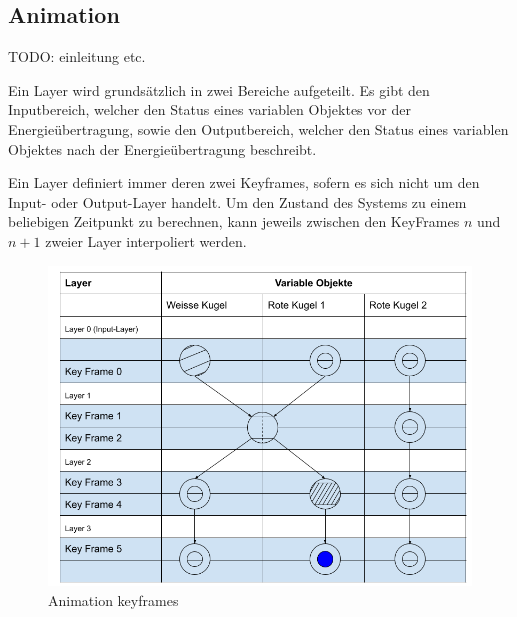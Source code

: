 \subsection{Animation}

TODO: einleitung etc.

Ein Layer wird grundsätzlich in zwei Bereiche aufgeteilt. Es gibt den Inputbereich, welcher den
Status eines variablen Objektes vor der Energieübertragung, sowie den Outputbereich, welcher den Status
eines variablen Objektes nach der Energieübertragung beschreibt.

Ein Layer definiert immer deren zwei Keyframes, sofern es sich nicht um den Input- oder Output-Layer handelt.
Um den Zustand des Systems zu einem beliebigen Zeitpunkt zu berechnen, kann
jeweils zwischen den KeyFrames $n$ und $n + 1$ zweier Layer interpoliert werden.

\begin{figure}[h!]
    \begin{center}
        \includegraphics[width=0.5\linewidth]{../common/03_billiard_ai/resources/18_animation_keyframes.png}
    \end{center}
    \caption{Animation keyframes}
    \label{fig:animation_keyframes_example}
\end{figure}
